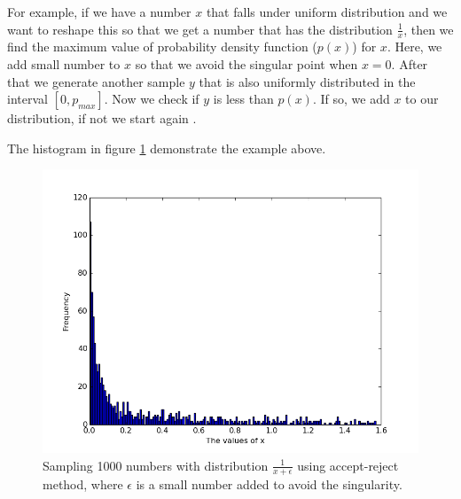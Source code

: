  
For example, if we have a number $x$ that falls under uniform distribution and we want to reshape this so that we get a number  that has the distribution $\frac{1}{x}$, then we find the maximum value of probability density function ($p(x)$) for $x$. Here, we add small number to $x$ so that we avoid the singular point when $x = 0$. After that we generate another sample $y$ that is also uniformly distributed in the interval $[0,p_{max}]$. 
Now we check if $y $ is less than $p(x)$. If so, we add $x$ to our distribution, if not we start again \citep{Weinzierl}. 

The histogram in figure \ref{fig:2} demonstrate the example above.

\begin{figure}[hbtp]
\centering
\includegraphics[scale=.5]{images/inverse_method.png}
\caption{Sampling 1000 numbers with distribution $\frac{1}{x+\epsilon}$ using accept-reject method, where $\epsilon$ is a small number added to avoid the singularity.}\label{fig:2}
\end{figure}

